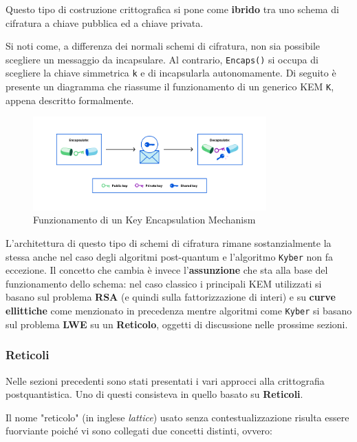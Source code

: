 \documentclass[a4paper, 12pt, oneside]{article}
\theoremstyle{definition}
\begin{document}
Questo tipo di costruzione crittografica si pone come \textbf{ibrido} tra uno schema di cifratura a chiave pubblica ed a chiave privata.

Si noti come, a differenza dei normali schemi di cifratura, non sia possibile scegliere un messaggio da incapsulare. Al contrario, \texttt{Encaps()} si occupa di scegliere la chiave simmetrica \texttt{k} e di incapsularla autonomamente.
\newpage
Di seguito è presente un diagramma che riassume il funzionamento di un generico KEM \texttt{K}, appena descritto formalmente.

\begin{figure}[H]
    \centering
    \includegraphics[width=0.8\textwidth]{images/kem_scheme.png}
    \caption[If you see me then something's very broken]{Funzionamento di un Key Encapsulation Mechanism\protect\footnotemark}
\end{figure}


L'architettura di questo tipo di schemi di cifratura rimane sostanzialmente la stessa anche nel caso degli algoritmi post-quantum e l'algoritmo \texttt{Kyber} non fa eccezione. Il concetto che cambia è invece l'\textbf{assunzione} che sta alla base del funzionamento dello schema: nel caso classico i principali KEM utilizzati si basano sul problema \textbf{RSA} (e quindi sulla fattorizzazione di interi) e su \textbf{curve ellittiche} come menzionato in precedenza mentre algoritmi come \texttt{Kyber} si basano sul problema \textbf{LWE} su un \textbf{Reticolo}, oggetti di discussione nelle prossime sezioni.
\newpage
\subsubsection{Reticoli}
Nelle sezioni precedenti sono stati presentati i vari approcci alla crittografia postquantistica. Uno di questi consisteva in quello basato su \textbf{Reticoli}.

Il nome "reticolo" (in inglese \textit{lattice}) usato senza contestualizzazione risulta essere fuorviante poiché vi sono collegati due concetti distinti, ovvero:
\end{document}
